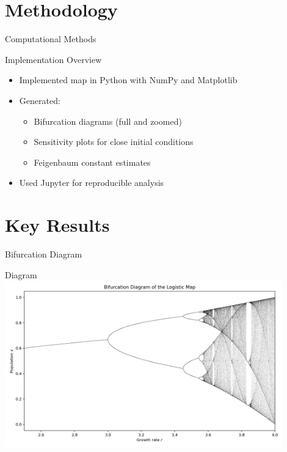 \documentclass{beamer}
\begin{document}
\section{Methodology}
\begin{frame}{Computational Methods}
  \begin{block}{Implementation Overview}
    \begin{itemize}
      \item Implemented map in Python with NumPy and Matplotlib
      \item Generated:
        \begin{itemize}
          \item Bifurcation diagrams (full and zoomed)
          \item Sensitivity plots for close initial conditions
          \item Feigenbaum constant estimates
        \end{itemize}
      \item Used Jupyter for reproducible analysis
    \end{itemize}
  \end{block}
\end{frame}
\section{Key Results}
\begin{frame}{Bifurcation Diagram}
  \begin{block}{Diagram}
    \includegraphics[width=0.9\textwidth]{../Backend/Data/bifurcation_placeholder.png}
  \end{block}
\end{frame}
\end{document}
